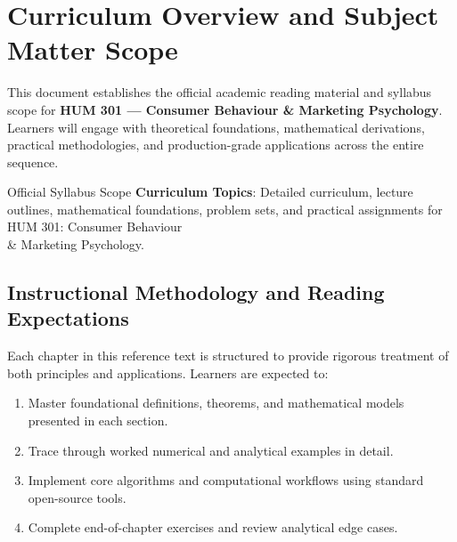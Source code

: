 \section{Curriculum Overview and Subject Matter Scope}

This document establishes the official academic reading material and syllabus scope for \textbf{HUM 301 --- Consumer Behaviour \& Marketing Psychology}. Learners will engage with theoretical foundations, mathematical derivations, practical methodologies, and production-grade applications across the entire sequence.

\begin{InsightBox}{Official Syllabus Scope}
  \textbf{Curriculum Topics}: Detailed curriculum, lecture outlines, mathematical foundations, problem sets, and practical assignments for HUM 301: Consumer Behaviour \\& Marketing Psychology.
\end{InsightBox}

\subsection{Instructional Methodology and Reading Expectations}

Each chapter in this reference text is structured to provide rigorous treatment of both principles and applications. Learners are expected to:
\begin{enumerate}
  \item Master foundational definitions, theorems, and mathematical models presented in each section.
  \item Trace through worked numerical and analytical examples in detail.
  \item Implement core algorithms and computational workflows using standard open-source tools.
  \item Complete end-of-chapter exercises and review analytical edge cases.
\end{enumerate}

